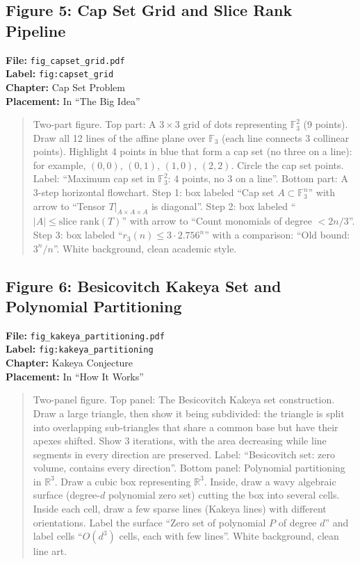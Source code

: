 \subsection*{Figure 5: Cap Set Grid and Slice Rank Pipeline}
\textbf{File:} \texttt{fig\_capset\_grid.pdf} \\
\textbf{Label:} \texttt{fig:capset\_grid} \\
\textbf{Chapter:} Cap Set Problem \\
\textbf{Placement:} In ``The Big Idea''

\begin{quote}
Two-part figure. Top part: A $3 \times 3$ grid of dots representing $\mathbb{F}_3^2$ (9 points). Draw all 12 lines of the affine plane over $\mathbb{F}_3$ (each line connects 3 collinear points). Highlight 4 points in blue that form a cap set (no three on a line): for example, $(0,0)$, $(0,1)$, $(1,0)$, $(2,2)$. Circle the cap set points. Label: ``Maximum cap set in $\mathbb{F}_3^2$: 4 points, no 3 on a line''. Bottom part: A 3-step horizontal flowchart. Step 1: box labeled ``Cap set $A \subset \mathbb{F}_3^n$'' with arrow to ``Tensor $T|_{A \times A \times A}$ is diagonal''. Step 2: box labeled ``$|A| \leq \text{slice rank}(T)$'' with arrow to ``Count monomials of degree $< 2n/3$''. Step 3: box labeled ``$r_3(n) \leq 3 \cdot 2.756^n$'' with a comparison: ``Old bound: $3^n/n$''. White background, clean academic style.
\end{quote}

\subsection*{Figure 6: Besicovitch Kakeya Set and Polynomial Partitioning}
\textbf{File:} \texttt{fig\_kakeya\_partitioning.pdf} \\
\textbf{Label:} \texttt{fig:kakeya\_partitioning} \\
\textbf{Chapter:} Kakeya Conjecture \\
\textbf{Placement:} In ``How It Works''

\begin{quote}
Two-panel figure. Top panel: The Besicovitch Kakeya set construction. Draw a large triangle, then show it being subdivided: the triangle is split into overlapping sub-triangles that share a common base but have their apexes shifted. Show 3 iterations, with the area decreasing while line segments in every direction are preserved. Label: ``Besicovitch set: zero volume, contains every direction''. Bottom panel: Polynomial partitioning in $\mathbb{R}^3$. Draw a cubic box representing $\mathbb{R}^3$. Inside, draw a wavy algebraic surface (degree-$d$ polynomial zero set) cutting the box into several cells. Inside each cell, draw a few sparse lines (Kakeya lines) with different orientations. Label the surface ``Zero set of polynomial $P$ of degree $d$'' and label cells ``$O(d^3)$ cells, each with few lines''. White background, clean line art.
\end{quote}


